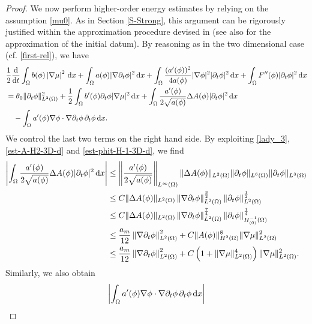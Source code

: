 \documentclass[11pt,reqno]{amsart}
\theoremstyle{remark}
\newcommand \norm[1] {\left\Vert #1\right\Vert}
\def\d{{\rm d}}
\def\ddt{\frac{\d}{\d t}}
\numberwithin{equation}{section}
\def\d{{\rm d}}
\begin{document}
\begin{proof}
\medskip
We now perform higher-order energy estimates by relying on the assumption \eqref{mu0}. As in Section \ref{S-Strong}, this argument can be rigorously justified within the approximation procedure devised in \cite{SP2013} (see also \cite[Section 4]{GMT2019} for the approximation of the initial datum).
By reasoning as in the two dimensional case (cf. \eqref{first-rel}), we have
\begin{align}
&\frac{1}{2} \ddt  \int_{\Omega} b(\phi)\left|\nabla \mu \right|^2 \, \d x
+\int_\Omega a(\phi) |\nabla \partial_t \phi|^2 \, \d x
+ \int_\Omega \frac{(a'(\phi))^2}{4 a(\phi)} |\nabla \phi|^2 |\partial_t \phi|^2 \, \d x + \int_\Omega F''(\phi)|\partial_t \phi|^2 \, \d x
\notag
\\ 
&= \theta_0 \| \partial_t \phi\|_{L^2(\Omega)}^2+ \frac{1}{2}  \int_{\Omega} b'(\phi) \partial_t \phi  |\nabla \mu|^2 \, \d x + \int_\Omega \frac{a'(\phi)}{2\sqrt{a(\phi)}} \Delta A(\phi) |\partial_t \phi|^2 \, \d x
\notag 
\\
&\quad
-  \int_\Omega a'(\phi) \nabla \phi \cdot \nabla \partial_t \phi \, \partial_t \phi \, \d x.
\label{first-rel-3D}
\end{align}
We control the last two terms on the right hand side. By exploiting \eqref{lady_3}, \eqref{est-A-H2-3D-d} and \eqref{est-phit-H-1-3D-d},  we find
\begin{align*}
\left| \int_\Omega \frac{a'(\phi)}{2\sqrt{a(\phi)}} \Delta A(\phi) |\partial_t \phi|^2 \, \d x \right|
&
\leq \left\| \frac{a'(\phi)}{2\sqrt{a(\phi)}} \right\|_{L^\infty(\Omega)}
\| \Delta A(\phi)\|_{L^2(\Omega)} \| \partial_t \phi\|_{L^6(\Omega)}\| \partial_t \phi\|_{L^3(\Omega)}
\\
&\leq
C \| \Delta A(\phi)\|_{L^2(\Omega)}
 \norm{\nabla \partial_t \phi}_{L^2(\Omega)}^{\frac32}\| \partial_t \phi\|_{L^2(\Omega)}^\frac12
\\
&\leq
C \| \Delta A(\phi)\|_{L^2(\Omega)}
 \norm{\nabla \partial_t \phi}_{L^2(\Omega)}^\frac74
\| \partial_t \phi\|_{H^{-1}_{(0)}(\Omega)}^\frac14
\\
&\leq
\frac{a_m}{12} \norm{\nabla \partial_t \phi}_{L^2(\Omega)}^2 +
C \| A(\phi)\|_{H^2(\Omega)}^8  \| \nabla \mu\|_{L^2(\Omega)}^2
\\
& \leq
\frac{a_m}{12} \norm{\nabla \partial_t \phi}_{L^2(\Omega)}^2 +
C\left( 1+ \| \nabla \mu\|_{L^2(\Omega)}^4\right)
 \| \nabla \mu\|_{L^2(\Omega)}^2.
\end{align*}
Similarly, we also obtain
\begin{align*}
\left|  \int_\Omega a'(\phi) \nabla \phi \cdot \nabla \partial_t \phi \, \partial_t \phi \, \d x  \right|

\end{align*}
\end{proof}
\end{document}
